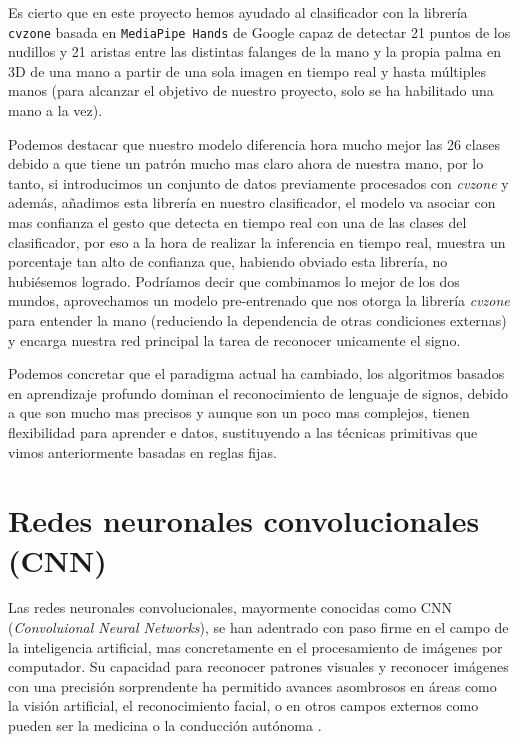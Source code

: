 Es cierto que en este proyecto hemos ayudado al clasificador con la librería \texttt{cvzone} basada en \texttt{MediaPipe Hands} de Google capaz de detectar 21 puntos de los nudillos y 21 aristas entre las distintas falanges de la mano y la propia palma en 3D de una mano a partir de una sola imagen en tiempo real y hasta múltiples manos (para alcanzar el objetivo de nuestro proyecto, solo se ha habilitado una mano a la vez)\cite{web:hand_landmarker}.


Podemos destacar que nuestro modelo diferencia hora mucho mejor las 26 clases debido a que tiene un patrón mucho mas claro ahora de nuestra mano, por lo tanto, si introducimos un conjunto de datos previamente procesados con \textit{cvzone} y además, añadimos esta librería en nuestro clasificador, el modelo va asociar con mas confianza el gesto que detecta en tiempo real con una de las clases del clasificador, por eso a la hora de realizar la inferencia en tiempo real, muestra un porcentaje tan alto de confianza que, habiendo obviado esta librería, no hubiésemos logrado. Podríamos decir que combinamos lo mejor de los dos mundos, aprovechamos un modelo pre-entrenado que nos otorga la librería \textit{cvzone} para entender la mano (reduciendo la dependencia de otras condiciones externas) y encarga nuestra red principal la tarea de reconocer unicamente el signo.

Podemos concretar que el paradigma actual ha cambiado, los algoritmos basados en aprendizaje profundo dominan el reconocimiento de lenguaje de signos, debido a que son mucho mas precisos y aunque son un poco mas complejos, tienen flexibilidad para aprender e datos, sustituyendo a las técnicas primitivas que vimos anteriormente basadas en reglas fijas.





\section{Redes neuronales convolucionales (CNN)}\label{redes-neuronales-convolucionales-cnn}

Las redes neuronales convolucionales, mayormente conocidas como CNN (\textit{Convoluional Neural Networks}), se han adentrado con paso firme en el campo de la inteligencia artificial, mas concretamente en el procesamiento de imágenes por computador. Su capacidad para reconocer patrones visuales y reconocer imágenes con una precisión sorprendente ha permitido avances asombrosos en áreas como la visión artificial, el reconocimiento facial, o en otros campos externos como pueden ser la medicina o la conducción autónoma \cite{web:cnn_ue}.

